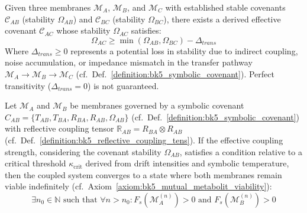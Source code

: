 \begin{axiom}
\label{axiom:bk5_covenant_transitivity}
Given three membranes $\mathscr{M}_A$, $\mathscr{M}_B$, and $\mathscr{M}_C$ with established stable covenants $\mathcal{C}_{AB}$ (stability $\Omega_{AB}$) and $\mathcal{C}_{BC}$ (stability $\Omega_{BC}$), there exists a derived effective covenant $\mathcal{C}_{AC}$ whose stability $\Omega_{AC}$ satisfies:
\begin{equation}
\Omega_{AC} \geq \min(\Omega_{AB}, \Omega_{BC}) - \Delta_{trans}
\end{equation}
Where $\Delta_{trans} \geq 0$ represents a potential loss in stability due to indirect coupling, noise accumulation, or impedance mismatch in the transfer pathway $\mathscr{M}_A \to \mathscr{M}_B \to \mathscr{M}_C$ (cf.~Def.~\ref{definition:bk5_symbolic_covenant}). Perfect transitivity ($\Delta_{trans}=0$) is not guaranteed.
\end{axiom}
\begin{theorem} \label{theorem:bk5_map_equilibrium}
Let \( \mathscr{M}_A \) and \( \mathscr{M}_B \) be membranes governed by a symbolic covenant \( C_{AB} = \{ T_{AB}, T_{BA}, R_{BA}, R_{AB}, \Omega_{AB} \} \) (cf.~Def.~\ref{definition:bk5_symbolic_covenant}) with reflective coupling tensor \( \mathbb{R}_{AB} = R_{BA} \otimes R_{AB} \) (cf.~Def.~\ref{definition:bk5_reflective_coupling_tens}). If the effective coupling strength, considering the covenant stability \( \Omega_{AB} \), satisfies a condition relative to a critical threshold \( \kappa_{\text{crit}} \) derived from drift intensities and symbolic temperature, then the coupled system converges to a state where both membranes remain viable indefinitely (cf.~Axiom~\ref{axiom:bk5_mutual_metabolit_viability}):
\begin{equation}
\exists n_0 \in \mathbb{N} \text{ such that } \forall n > n_0: F_s(\mathscr{M}_A^{(n)}) > 0 \text{ and } F_s(\mathscr{M}_B^{(n)}) > 0
\end{equation}
\end{theorem}

